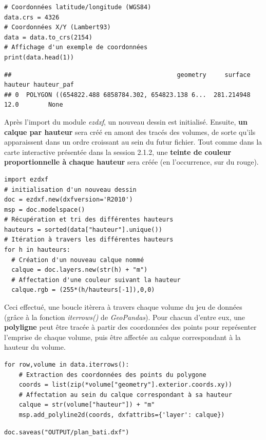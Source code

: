 \documentclass[
  11pt,
  french,
]{article}
\begin{document}
\begin{tcolorbox}[title= Changement du Système de Coordonnées de Référence ,colback=boitecode]
\begin{lstlisting}[style=code]
# Coordonnées latitude/longitude (WGS84)
data.crs = 4326
# Coordonnées X/Y (Lambert93)
data = data.to_crs(2154)
# Affichage d'un exemple de coordonnées
print(data.head(1))\end{lstlisting}
\begin{lstlisting}[style=out]
##                                             geometry     surface  hauteur hauteur_paf
## 0  POLYGON ((654822.488 6858784.302, 654823.138 6...  281.214948     12.0        None
\end{lstlisting}
\end{tcolorbox}

Après l'import du module \emph{ezdxf}, un nouveau dessin est initialisé.
Ensuite, \textbf{un calque par hauteur} sera créé en amont des tracés
des volumes, de sorte qu'ils apparaissent dans un ordre croissant au
sein du futur fichier. Tout comme dans la carte interactive présentée
dans la session 2.1.2, une \textbf{teinte de couleur proportionnelle à
chaque hauteur} sera créée (en l'occurrence, sur du rouge).

\begin{tcolorbox}[title= Initialisation du dessin et création des calques ,colback=boitecode]
\begin{lstlisting}[style=code]
import ezdxf
# initialisation d'un nouveau dessin
doc = ezdxf.new(dxfversion='R2010')
msp = doc.modelspace()
# Récupération et tri des différentes hauteurs
hauteurs = sorted(data["hauteur"].unique())
# Itération à travers les différentes hauteurs
for h in hauteurs:
  # Création d'un nouveau calque nommé
  calque = doc.layers.new(str(h) + "m")
  # Affectation d'une couleur suivant la hauteur
  calque.rgb = (255*(h/hauteurs[-1]),0,0)\end{lstlisting}
\end{tcolorbox}

Ceci effectué, une boucle itèrera à travers chaque volume du jeu de
données (grâce à la fonction \emph{iterrows()} de \emph{GeoPandas}).
Pour chacun d'entre eux, une \textbf{polyligne} peut être tracée à
partir des coordonnées des points pour représenter l'emprise de chaque
volume, puis être affectée au calque correspondant à la hauteur du
volume.

\begin{tcolorbox}[title= Traçage des volumes et affectation dans les calques ,colback=boitecode]
\begin{lstlisting}[style=code]
for row,volume in data.iterrows():
    # Extraction des coordonnées des points du polygone
    coords = list(zip(*volume["geometry"].exterior.coords.xy))
    # Affectation au sein du calque correspondant à sa hauteur
    calque = str(volume["hauteur"]) + "m"
    msp.add_polyline2d(coords, dxfattribs={'layer': calque})\end{lstlisting}
\begin{lstlisting}[style=code]
doc.saveas("OUTPUT/plan_bati.dxf")\end{lstlisting}
\end{tcolorbox}
\end{document}
